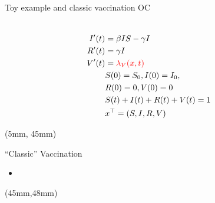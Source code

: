 \begin{frame}{Toy example and classic vaccination OC}
\begin{textblock*}{65mm}
{\begin{equation*}
\begin{aligned}
                   \\
                   I'(t) &=  \beta IS - \gamma I
                   \\
                   R'(t) & = \gamma I
                   \\
                   V'(t) & = \textcolor{red}{\lambda_V(x,t)}
                   \\
                   & S(0) = S_0, I(0)=I_0, 
                   \\
                   &R(0)=0, V(0)=0
                   \\
                   & S(t) + I(t) + R(t) + V(t)= 1
                   \\
                   & x^{\top}=(S,I,R,V)
                \end{aligned}
            \end{equation*}
        }
     \end{textblock*}
     \begin{textblock*}{28mm}(5mm, 45mm)
        \begin{block}{``Classic'' Vaccination}
            \begin{itemize}          
                \item
                
            \end{itemize}
        \end{block}
     \end{textblock*}
     \begin{textblock*}{80mm}(45mm,48mm)
     \end{textblock*}
 \end{frame}
